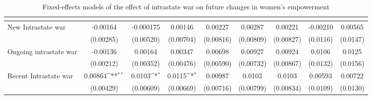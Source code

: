 \begin{table}[htbp]\centering
\def\sym#1{\ifmmode^{#1}\else\(^{#1}\)\fi}
\caption{Fixed-effects models of the effect of intrastate war on future changes in women's empowerment\label{intrawarpolempower}}
\begin{tabular}{l*{8}{c}}
\hline\hline
                    &&&&&&&&\\
\hline
New Intrastate war            &    -0.00164         &   -0.000175         &     0.00146         &     0.00227         &     0.00287         &     0.00221         &    -0.00210         &     0.00565         \\
                    &   (0.00285)         &   (0.00520)         &   (0.00704)         &   (0.00816)         &   (0.00809)         &   (0.00827)         &    (0.0116)         &    (0.0147)         \\
[1em]
Ongoing intrastate war         &    -0.00136         &     0.00164         &     0.00347         &     0.00698         &     0.00927         &     0.00924         &      0.0106         &      0.0125         \\
                    &   (0.00212)         &   (0.00352)         &   (0.00476)         &   (0.00590)         &   (0.00732)         &   (0.00867)         &    (0.0132)         &    (0.0156)         \\
[1em]
Recent Intrastate war           &     0.00864\sym{**} &      0.0103\sym{*}  &      0.0115\sym{*}  &     0.00987         &      0.0103         &      0.0103         &     0.00593         &     0.00722         \\
                    &   (0.00429)         &   (0.00609)         &   (0.00669)         &   (0.00716)         &   (0.00799)         &   (0.00834)         &    (0.0109)         &    (0.0130)         \\

\end{tabular}
\end{table}
